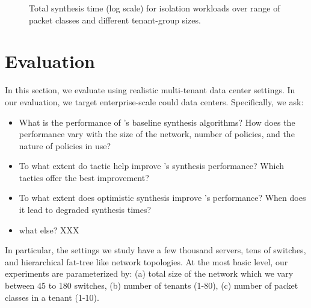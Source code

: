 \begin{figure*}[width=2\columnwidth]
	\centering
	\caption{\label{fig:isolation}
		Total synthesis time (log scale) for isolation workloads over range of packet classes and different tenant-group sizes.}
\end{figure*}

\section{Evaluation}
In this section, we evaluate \Name using 
realistic multi-tenant data
center settings. 
In our evaluation, we target enterprise-scale could data centers.
Specifically, we ask:

\begin{itemize}

\item What is the performance of \Name's baseline synthesis
  algorithms? How does the performance vary with the size of the
  network, number of policies, and the nature of policies in use?

\item To what extent do tactic help improve \Name's synthesis
  performance? Which tactics offer the best improvement?

\item To what extent does optimistic synthesis improve \Name's
  performance? When does it lead to degraded synthesis times?

\item what else? XXX

\end{itemize}

 In
particular, the settings we study have a few thousand servers, tens of
switches, and hierarchical fat-tree like network topologies. At the
most basic level, our experiments are parameterized by: (a) total size
of the network which we vary between 45 to 180 switches, (b) number of
tenants (1-80), (c) number of packet classes in a tenant (1-10). 

